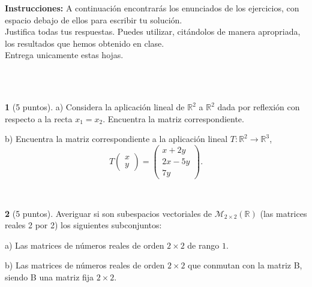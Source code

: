 \documentclass[12pt,a4paper]{report}
\theoremstyle{definition}
\newtheorem{ex}{}
\newcommand{\RR}{\ensuremath{\mathbb R}}
\begin{document}
\noindent
\textsf{{\bf \sffamily  Instrucciones:} 
A continuaci\'on encontrar\'as los enunciados de los ejercicios, con espacio debajo de ellos para escribir tu soluci\'on.\\
Justifica todas tus respuestas.
Puedes utilizar, cit\'andolos de manera apropriada, los resultados que hemos obtenido en clase.\\
Entrega unicamente estas hojas.
}
 
 \noindent
\hrulefill{}\\


\newpage 
\hrulefill{}\\ 
\begin{ex}[5 puntos]   
a)  Considera la aplicaci\'on lineal de $\RR^2$ a $\RR^2$ dada por reflexi\'on con respecto a la recta $x_1=x_2$. Encuentra la matriz correspondiente.

b) Encuentra la matriz correspondiente a la aplicaci\'on lineal
$T \colon  \RR^2 \to \RR^3$,
$$T\left(\begin{array}{c}x\\y \end{array}\right) = \left(\begin{array}{c}x + 2y\\ 2x - 5y\\ 7y\end{array}\right).$$ \end{ex}  

\newpage  
\hrulefill{}\\ 
\begin{ex}[5 puntos]  Averiguar si son subespacios vectoriales de $\mathcal{M}_{2\times 2}(\mathbb{R})$ (las matrices reales 2 por 2) los siguientes subconjuntos: 
 
a) Las matrices de n\'umeros reales de orden $2\times 2$ de rango $1$. 

b) Las matrices de n\'umeros reales de orden $2\times 2$ que conmutan con la matriz 
B, siendo B una matriz fija $2\times 2$. 
\end{ex} 
\end{document}

